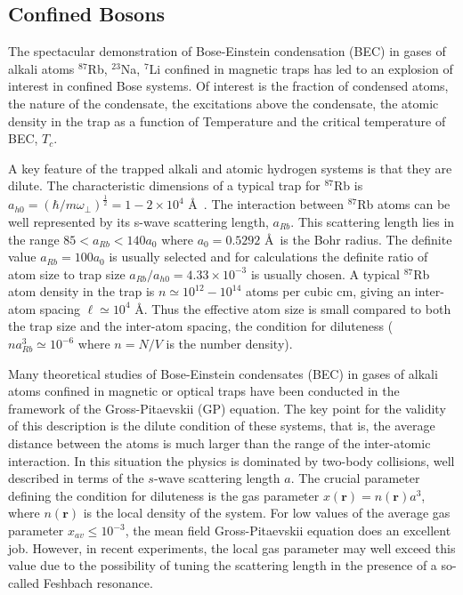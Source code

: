 \documentclass[twoside,english]{uiofysmaster}
\begin{document}
\subsection{Confined Bosons}

The spectacular demonstration of Bose-Einstein condensation (BEC) in gases of
 alkali atoms $^{87}$Rb, $^{23}$Na, $^7$Li confined in magnetic
 traps has led to an explosion of interest in
 confined Bose systems. Of interest is the fraction of condensed atoms, the
 nature of the condensate, the excitations above the condensate, the atomic
 density in the trap as a function of Temperature and the critical temperature of BEC,
 $T_c$. 

 A key feature of the trapped alkali and atomic hydrogen systems is that they are
 dilute. The characteristic dimensions of a typical trap for $^{87}$Rb is
 $a_{h0}=\left( {\hbar}/{m\omega_\perp}\right)^\frac{1}{2}=1-2 \times 10^4$
 \AA\ . The interaction between $^{87}$Rb atoms can be well represented
 by its s-wave scattering length, $a_{Rb}$. This scattering length lies in the
 range $85 < a_{Rb} < 140 a_0$ where $a_0 = 0.5292$ \AA\ is the Bohr radius.
 The definite value $a_{Rb} = 100 a_0$ is usually selected and
 for calculations the definite ratio of atom size to trap size 
 $a_{Rb}/a_{h0} = 4.33 \times 10^{-3}$ 
 is usually chosen. A typical $^{87}$Rb atom
 density in the trap is $n \simeq 10^{12}- 10^{14}$ atoms per cubic cm, giving an
 inter-atom spacing $\ell \simeq 10^4$ \AA. Thus the effective atom size is small
 compared to both the trap size and the inter-atom spacing, the condition
 for diluteness ($na^3_{Rb} \simeq 10^{-6}$ where $n = N/V$ is the number
 density). 

Many theoretical studies of Bose-Einstein condensates (BEC) in gases
of alkali atoms confined in magnetic or optical traps have been
conducted in the framework of the Gross-Pitaevskii (GP) equation.  The
key point for the validity of this description is the dilute condition
of these systems, that is, the average distance between the atoms is
much larger than the range of the inter-atomic interaction. In this
situation the physics is dominated by two-body collisions, well
described in terms of the $s$-wave scattering length $a$. 
The crucial
parameter defining the condition for diluteness is the gas parameter
$x(\mathbf{r})= n(\mathbf{r}) a^3$, where $n(\mathbf{r})$ is the local density
of the system. For low values of the average gas parameter $x_{av}\le 10^{-3}$, the mean field Gross-Pitaevskii equation does an excellent
job.  However,
in recent experiments, the local gas parameter may well exceed this
value due to the possibility of tuning the scattering length in the
presence of a so-called Feshbach resonance.
\end{document}
